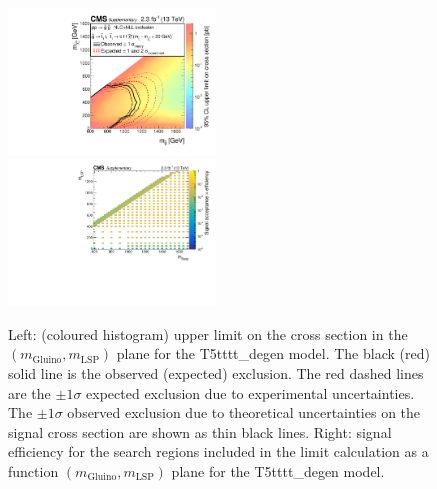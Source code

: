 \clearpage
\begin{figure}[t]
  \begin{center}
    \includegraphics[width=0.49\textwidth]{supplementary/figures/RA1T5tttt-degenXSEC} \, 
    \includegraphics[width=0.49\textwidth]{supplementary/figures/T5tttt_degen_merging_4_cats} \,     
  \end{center}
  \caption{Left: (coloured histogram) upper limit on the cross section in the $(m_{\mathrm{Gluino}},m_{\mathrm{LSP}})$ plane for the T5tttt\_degen model. 
  The black (red) solid line is the observed (expected) exclusion. The red dashed lines are the $\pm1\sigma$ expected exclusion due to experimental uncertainties. 
  The $\pm1\sigma$ observed exclusion due to theoretical uncertainties on the signal cross section are shown as thin black lines. 
  Right: signal efficiency for the search regions included in the limit calculation as a function $(m_{\mathrm{Gluino}},m_{\mathrm{LSP}})$ plane for the T5tttt\_degen model. 
  \label{fig:T5tttt_degen_excl}}
\end{figure}

